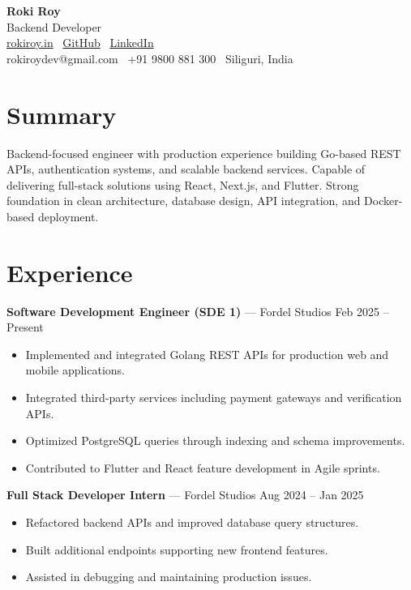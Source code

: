 \documentclass[10pt, letterpaper]{article}
\newenvironment{tightitem}{
    \begin{itemize}[topsep=0pt, itemsep=0pt, parsep=0.3pt, leftmargin=10pt]
}{
    \end{itemize}
}
\begin{document}
\begin{center}
{\fontsize{20pt}{20pt}\selectfont \textbf{Roki Roy}} \\[1pt]
Backend Developer \\[1pt]
\href{https://rokiroy.in}{rokiroy.in} \textbullet\
\href{https://github.com/royroki}{GitHub} \textbullet\
\href{https://linkedin.com/in/rokiroy}{LinkedIn} \\
rokiroydev@gmail.com \textbullet\ +91 9800 881 300 \textbullet\ Siliguri, India
\end{center}

\section{Summary}

Backend-focused engineer with production experience building Go-based REST APIs, authentication systems, and scalable backend services. Capable of delivering full-stack solutions using React, Next.js, and Flutter. Strong foundation in clean architecture, database design, API integration, and Docker-based deployment.

\section{Experience}

\textbf{Software Development Engineer (SDE 1)} — Fordel Studios \hfill Feb 2025 -- Present  
\begin{tightitem}
\item Implemented and integrated Golang REST APIs for production web and mobile applications.
\item Integrated third-party services including payment gateways and verification APIs.
\item Optimized PostgreSQL queries through indexing and schema improvements.
\item Contributed to Flutter and React feature development in Agile sprints.
\end{tightitem}

\textbf{Full Stack Developer Intern} — Fordel Studios \hfill Aug 2024 -- Jan 2025  
\begin{tightitem}
\item Refactored backend APIs and improved database query structures.
\item Built additional endpoints supporting new frontend features.
\item Assisted in debugging and maintaining production issues.
\end{tightitem}
\end{document}
